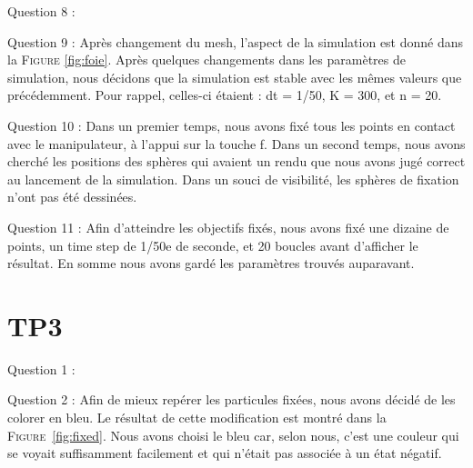 \documentclass[a4paper,12pt]{article}
\begin{document}
Question 8 :%

Question 9 : Après changement du mesh, l'aspect de la simulation est donné dans la \textsc{Figure} \ref{fig:foie}. Après quelques changements dans les paramètres de simulation, nous décidons que la simulation est stable avec les mêmes valeurs que précédemment. Pour rappel, celles-ci étaient : dt = 1/50, K = 300, et n = 20.

Question 10 : Dans un premier temps, nous avons fixé tous les points en contact avec le manipulateur, à l'appui sur la touche \og{}f\fg{}. Dans un second temps, nous avons cherché les positions des sphères qui avaient un rendu que nous avons jugé correct au lancement de la simulation. Dans un souci de visibilité, les sphères \og{}de fixation\fg{} n'ont pas été dessinées.


Question 11 : Afin d'atteindre les objectifs fixés, nous avons fixé une dizaine de points, un time step de 1/50e de seconde, et 20 boucles avant d'afficher le résultat. En somme nous avons gardé les paramètres trouvés auparavant.

\section{TP3}

Question 1 :

Question 2 : Afin de mieux repérer les particules fixées, nous avons décidé de les colorer en bleu. Le résultat de cette modification est montré dans la \textsc{Figure}~\ref{fig:fixed}. Nous avons choisi le bleu car, selon nous, c'est une couleur qui se voyait suffisamment facilement et qui n'était pas associée à un état négatif.
\end{document}
